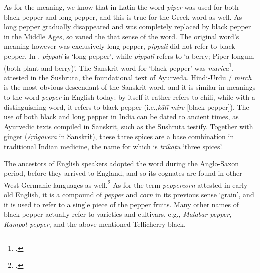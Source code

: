 As for the meaning, we know that in Latin the word \textit{piper} was used for both black pepper and long pepper, and this is true for the Greek word as well. As long pepper gradually disappeared and was completely replaced by black pepper in the Middle Ages, so vaned the that sense of the word. The original word's meaning however was exclusively long pepper, \textit{pippali} did not refer to black pepper. In \textcite{monier-williams_sanskrit-english_1899}, \textit{pippali} is `long pepper', while \textit{pippalī} refers to `a berry; Piper longum (both plant and berry)'. The Sanskrit word for `black pepper' was  \textit{marica}\footcite[790]{monier-williams_sanskrit-english_1899}, attested in the \gls{Sushruta}, the foundational text of \gls{Ayurveda}. Hindi-Urdu / \textit{mirch} is the most obvious descendant of the Sanskrit word, and it is similar in meanings to the word \textit{pepper} in English today: by itself it rather refers to chili, while with a distinguishing word, it refers to black pepper (i.e.,\textit{kālī mirc} [black pepper]). The use of both black and long pepper in India can be dated to ancient times, as Ayurvedic texts compiled in Sanskrit, such as the \gls{Sushruta} testify. Together with ginger (\textit{śṛṅgavera} in Sanskrit), these three spices are a base combination in traditional Indian medicine, the name for which is  \textit{trikaṭu} `three spices'.

The ancestors of English speakers adopted the word during the Anglo-Saxon period, before they arrived to England, and so its cognates are found in other West Germanic languages as well.\footcite[pepper]{cresswell_oxford_2021} As for the term \textit{peppercorn} attested in early old English, it is a compound of \textit{pepper} and \textit{corn}  in its previous sense `grain', and it is used to refer to a single piece of the pepper fruits. Many other names of black pepper actually refer to varieties and cultivars, e.g., \textit{Malabar pepper}, \textit{Kampot pepper}, and the above-mentioned Tellicherry black.



